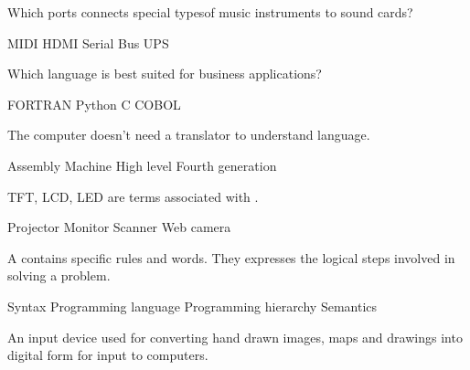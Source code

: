 \documentclass[a4paper]{exam}
\begin{document}
\begin{center}
\end{center}

\begin{center}
\vspace{5mm}

\vspace{5mm}
\end{center}

\begin{questions}
\question Which ports connects special typesof music instruments to sound cards?

\begin{oneparchoices}
    \choice MIDI
    \choice HDMI
    \choice Serial Bus
    \choice UPS
\end{oneparchoices}

\question Which language is best suited for business applications?

\begin{oneparchoices}
    \choice FORTRAN
    \choice Python
    \choice C
    \choice COBOL
\end{oneparchoices}

\question The computer doesn't need a translator to understand \fillin[100] language.

\begin{oneparchoices}
    \choice Assembly
    \choice Machine
    \choice High level
    \choice Fourth generation
\end{oneparchoices}

\question TFT, LCD, LED are terms associated with \fillin[100].

\begin{oneparchoices}
    \choice Projector
    \choice Monitor
    \choice Scanner
    \choice Web camera
\end{oneparchoices}

\question A \fillin[100] contains specific rules and words. They expresses the logical steps involved in solving a problem.

\begin{oneparchoices}
    \choice Syntax
    \choice Programming language
    \choice Programming hierarchy
    \choice Semantics
\end{oneparchoices}

\question An input device used for converting hand drawn images, maps and drawings into digital form for input to computers.


\end{questions}
\end{document}
